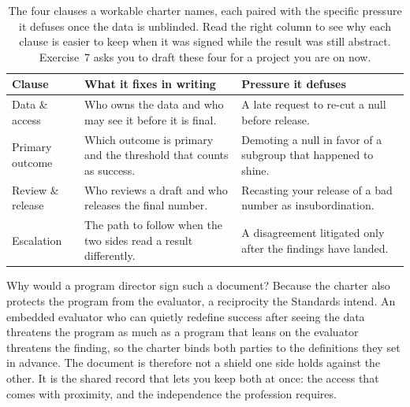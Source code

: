 \documentclass[
    a4paper,
    fontsize=10pt,
    twoside=true,
    numbers=noenddot,
]{kaobook}
\begin{document}
\begin{table}[htbp]
\centering
\footnotesize
\caption[The one-page charter's four clauses]{The four clauses a workable charter names, each paired with the specific pressure it defuses once the data is unblinded. Read the right column to see why each clause is easier to keep when it was signed while the result was still abstract. Exercise~7 asks you to draft these four for a project you are on now.}
\label{tab:ch01-viz-charter}
\footnotesize
\begin{tabular}{@{}p{2.0cm}p{3.6cm}p{3.5cm}@{}}
\hline
\textbf{Clause} & \textbf{What it fixes in writing} & \textbf{Pressure it defuses} \\
\hline
Data \& access & Who owns the data and who may see it before it is final. & A late request to re-cut a null before release. \\
Primary outcome & Which outcome is primary and the threshold that counts as success. & Demoting a null in favor of a subgroup that happened to shine. \\
Review \& release & Who reviews a draft and who releases the final number. & Recasting your release of a bad number as insubordination. \\
Escalation & The path to follow when the two sides read a result differently. & A disagreement litigated only after the findings have landed. \\
\hline
\end{tabular}
\end{table}

Why would a program director sign such a document? Because the charter also protects the program from the evaluator, a reciprocity the Standards intend. An embedded evaluator who can quietly redefine success after seeing the data threatens the program as much as a program that leans on the evaluator threatens the finding, so the charter binds both parties to the definitions they set in advance. The document is therefore not a shield one side holds against the other. It is the shared record that lets you keep both at once: the access that comes with proximity, and the independence the profession requires.
\end{document}
